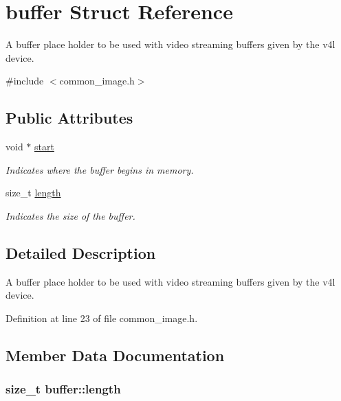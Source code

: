 \hypertarget{structbuffer}{\section{buffer \-Struct \-Reference}
\label{structbuffer}
}


\-A buffer place holder to be used with video streaming buffers given by the v4l device.  




{\ttfamily \#include $<$common\-\_\-image.\-h$>$}

\subsection*{\-Public \-Attributes}
\begin{DoxyCompactItemize}
\item 
void $\ast$ \hyperlink{structbuffer_a8be3721dc0863d9dd7460504bbaeb0d1}{start}
\begin{DoxyCompactList}\small\item\em \-Indicates where the buffer begins in memory. \end{DoxyCompactList}\item 
size\-\_\-t \hyperlink{structbuffer_a4f467cc251f2f4504d484913c7da47bd}{length}
\begin{DoxyCompactList}\small\item\em \-Indicates the size of the buffer. \end{DoxyCompactList}\end{DoxyCompactItemize}


\subsection{\-Detailed \-Description}
\-A buffer place holder to be used with video streaming buffers given by the v4l device. 

\-Definition at line 23 of file common\-\_\-image.\-h.



\subsection{\-Member \-Data \-Documentation}
\hypertarget{structbuffer_a4f467cc251f2f4504d484913c7da47bd}{
\subsubsection[{length}]{\setlength{\rightskip}{0pt plus 5cm}size\-\_\-t {\bf buffer\-::length}}}\label{structbuffer_a4f467cc251f2f4504d484913c7da47bd}


